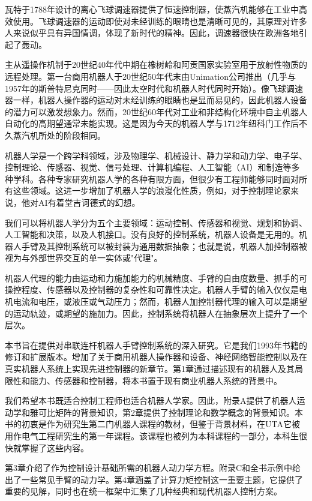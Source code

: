 \documentclass[UTF8,a4paper]{ctexart}
\begin{document}
瓦特于1788年设计的离心飞球调速器提供了恒速控制器，使蒸汽机能够在工业中高效使用。飞球调速器的运动即使对未经训练的眼睛也是清晰可见的，其原理对许多人来说似乎具有异国情调，体现了新时代的精神。因此，调速器很快在欧洲各地引起了轰动。

主从遥操作机制于20世纪40年代中期在橡树岭和阿贡国家实验室用于放射性物质的远程处理。第一台商用机器人于20世纪50年代末由Unimation公司推出（几乎与1957年的斯普特尼克同时——因此太空时代和机器人时代同时开始）。像飞球调速器一样，机器人操作器的运动对未经训练的眼睛也是显而易见的，因此机器人设备的潜力可以激发想象力。然而，20世纪60年代对工业和非结构化环境中自主机器人自动化的高期望通常未能实现。这是因为今天的机器人学与1712年纽科门工作后不久蒸汽机所处的阶段相同。

机器人学是一个跨学科领域，涉及物理学、机械设计、静力学和动力学、电子学、控制理论、传感器、视觉、信号处理、计算机编程、人工智能（AI）和制造等多种学科。各种专家研究机器人学的各种有限方面，但很少有工程师能够同时面对所有这些领域。这进一步增加了机器人学的浪漫化性质，例如，对于控制理论家来说，他对AI有着堂吉诃德式的幻想。

我们可以将机器人学分为五个主要领域：运动控制、传感器和视觉、规划和协调、人工智能和决策，以及人机接口。没有良好的控制系统，机器人设备是无用的。机器人手臂及其控制系统可以被封装为通用数据抽象；也就是说，机器人加控制器被视为与外部世界交互的单一实体或"代理"。

机器人代理的能力由运动和力施加能力的机械精度、手臂的自由度数量、抓手的可操控程度、传感器以及控制器的复杂性和可靠性决定。机器人手臂的输入仅仅是电机电流和电压，或液压或气动压力；然而，机器人加控制器代理的输入可以是期望的运动轨迹，或期望的施加力。因此，控制系统将机器人在抽象层次上提升了一个层次。

本书旨在提供对串联连杆机器人手臂控制系统的深入研究。它是我们1993年书籍的修订和扩展版本。增加了关于商用机器人操作器和设备、神经网络智能控制以及在真实机器人系统上实现先进控制器的新章节。第1章通过描述现有的机器人及其局限性和能力、传感器和控制器，将本书置于现有商业机器人系统的背景中。

我们希望本书既适合控制工程师也适合机器人学家。因此，附录A提供了机器人运动学和雅可比矩阵的背景知识，第2章提供了控制理论和数学概念的背景知识。本书的初衷是作为研究生第二门机器人课程的教材，但鉴于背景材料，在UTA它被用作电气工程研究生的第一年课程。该课程也被列为本科课程的一部分，本科生很快就掌握了这些内容。

第3章介绍了作为控制设计基础所需的机器人动力学方程。附录C和全书示例中给出了一些常见手臂的动力学。第4章涵盖了计算力矩控制这一重要主题，它提供了重要的见解，同时也在统一框架中汇集了几种经典和现代机器人控制方案。
\end{document}
